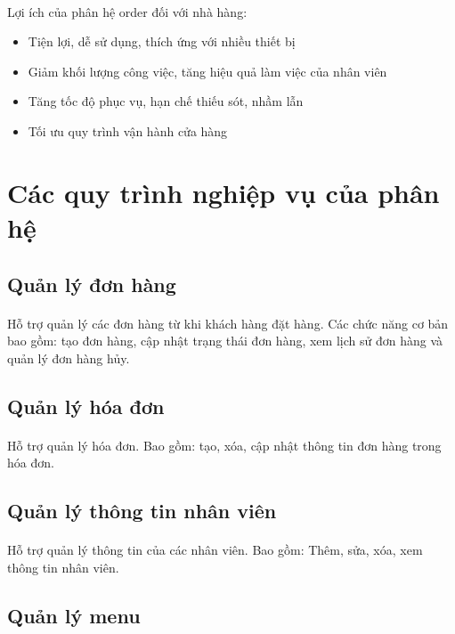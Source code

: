 \documentclass{report}
\begin{document}
    \paragraph{}
    Lợi ích của phân hệ order đối với nhà hàng: 
    \begin{itemize}
        \item Tiện lợi, dễ sử dụng, thích ứng với nhiều thiết bị
        \item Giảm khối lượng công việc, tăng hiệu quả làm việc của nhân viên
        \item Tăng tốc độ phục vụ, hạn chế thiếu sót, nhầm lẫn 
        \item Tối ưu quy trình vận hành cửa hàng
    \end{itemize}
\section{Các quy trình nghiệp vụ của phân hệ}
\subsection{Quản lý đơn hàng}
\paragraph{}
Hỗ trợ quản lý các đơn hàng từ khi khách hàng đặt hàng. Các chức năng cơ bản bao gồm: tạo đơn hàng, cập nhật trạng thái đơn hàng, xem lịch sử đơn hàng và quản lý đơn hàng hủy.
\subsection{Quản lý hóa đơn}
\paragraph{}
Hỗ trợ quản lý hóa đơn. Bao gồm: tạo, xóa, cập nhật thông tin đơn hàng trong hóa đơn.
\subsection{Quản lý thông tin nhân viên}
\paragraph{}
Hỗ trợ quản lý thông tin của các nhân viên. Bao gồm: Thêm, sửa, xóa, xem thông tin nhân viên.
\subsection{Quản lý menu}
\end{document}
